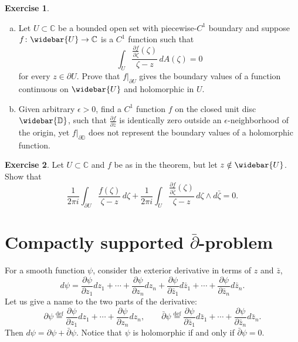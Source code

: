 \documentclass[12pt,openany]{book}
\newcommand{\C}{{\mathbb{C}}}
\newcommand{\D}{{\mathbb{D}}}
\theoremstyle{plain}
\theoremstyle{remark}
\theoremstyle{definition}
\newenvironment{exbox}{%
    \def\FrameCommand{\vrule width 1pt \relax\hspace{10pt}}%
    \MakeFramed{\advance\hsize-\width\FrameRestore}%
}{%
    \endMakeFramed
}
\newenvironment{exparts}{%
    \leavevmode\begin{enumerate}[a),noitemsep,topsep=0pt,parsep=0pt,partopsep=0pt]
}{%
    \end{enumerate}
}
\theoremstyle{exercise}
\newtheorem{exercise}{Exercise}[section]
\theoremstyle{example}
\begin{document}
\begin{exbox}
\begin{exercise}
\begin{exparts}
\item
Let $U \subset \C$ be a bounded open set with piecewise-$C^1$ boundary and
suppose $f \colon \widebar{U} \to \C$ is a $C^1$ function such
that
\begin{equation*}
\int_{U} \frac{\frac{\partial f}{\partial \bar{\zeta}}(\zeta)}{\zeta-z} \,
dA(\zeta) = 0
\end{equation*}
for every $z \in \partial U$.  Prove that $f|_{\partial U}$ gives the boundary
values of a function continuous on $\widebar{U}$ and holomorphic in $U$.
\item
Given arbitrary $\epsilon > 0$, find a $C^1$ function $f$ on the closed unit disc
$\widebar{\D}$,
such that $\frac{\partial f}{\partial \bar{z}}$ is identically zero
outside an $\epsilon$-neighborhood of the origin, yet $f|_{\partial \D}$
does not represent the boundary values of a holomorphic function.
\end{exparts}
\end{exercise}

\begin{exercise}
Let $U \subset \C$ and $f$ be as in the theorem, but let $z \notin
\widebar{U}$.  Show that
\begin{equation*}
\frac{1}{2\pi i}
\int_{\partial U}
\frac{f(\zeta)}{\zeta-z}
\,
d \zeta
+
\frac{1}{2\pi i}
\int_{U}
\frac{\frac{\partial f}{\partial \bar{\zeta}}(\zeta)}{\zeta-z}
\,
d\zeta \wedge d\bar{\zeta}
= 0 .
\end{equation*}
\end{exercise}
\end{exbox}


\section{Compactly supported \texorpdfstring{$\bar{\partial}$}{dbar}-problem}
\label{sec:compactdbar}

For a smooth function $\psi$, consider the exterior
derivative in terms of $z$ and $\bar{z}$,
%
\begin{equation*}
d \psi =
\frac{\partial \psi}{\partial z_1} dz_1 + \cdots +
\frac{\partial \psi}{\partial z_n} dz_n
+
\frac{\partial \psi}{\partial \bar{z}_1} d\bar{z}_1 + \cdots +
\frac{\partial \psi}{\partial \bar{z}_n} d\bar{z}_n .
\end{equation*}
Let us give a name to the two parts of the derivative:
%
%
\begin{equation*}
\partial \psi \overset{\text{def}}{=}
\frac{\partial \psi}{\partial z_1} dz_1 + \cdots +
\frac{\partial \psi}{\partial z_n} dz_n, \qquad
\bar{\partial} \psi \overset{\text{def}}{=}
\frac{\partial \psi}{\partial \bar{z}_1} d\bar{z}_1 + \cdots +
\frac{\partial \psi}{\partial \bar{z}_n} d\bar{z}_n .
\end{equation*}
Then $d \psi = \partial \psi + \bar{\partial} \psi$.
Notice that $\psi$ is holomorphic if and only if $\bar{\partial} \psi = 0$.
\end{document}
